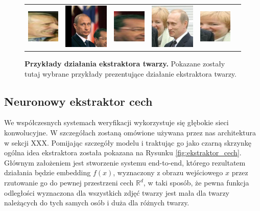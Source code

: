 \begin{figure}[H]
\begin{center}
\begin{tabular}{cc||cc||cc}
      \includegraphics[width=.15\linewidth]{img/crop_examples/after/bad/Jennifer_Lopez_0020.jpg} &
      \includegraphics[width=.15\linewidth]{img/crop_examples/before/bad/Vladimir_Putin_0031.jpg} &
      \includegraphics[width=.15\linewidth]{img/crop_examples/after/bad/Vladimir_Putin_0031.jpg} &
      \includegraphics[width=.15\linewidth]{img/crop_examples/before/bad/Vladimir_Putin_0040.jpg} &
      \includegraphics[width=.15\linewidth]{img/crop_examples/after/bad/Vladimir_Putin_0040.jpg} \\
    \end{tabular}
    \end{center}
    \caption{{\bf Przykłady działania ekstraktora twarzy.} Pokazane zostały tutaj wybrane przykłady prezentujące działanie ekstraktora twarzy.}
    \label{fig:ekstraktor_twarzy}
    \end{figure}

\subsection{Neuronowy ekstraktor cech} \label{sec:ekstraktor}

We współczesnych systemach weryfikacji wykorzystuje się głębokie sieci konwolucyjne. W
szczegółach zostaną omówione używana przez nas architektura w sekcji XXX. Pomijając szczegóły
modelu i traktując go jako czarną skrzynkę ogólna idea ekstraktora została pokazana na Rysunku
\ref{fig:ekstraktor_cech}. Głównym założeniem jest stworzenie systemu end-to-end, którego
rezultatem działania będzie embedding \(f(x)\), wyznaczony z obrazu wejściowego \(x\) przez
rzutowanie go do pewnej przestrzeni cech \(\mathbb{R}^d\), w taki sposób, że pewna funkcja
odległości wyznaczona dla wszystkich zdjęć twarzy jest mała dla twarzy należących do tych samych
osób i duża dla różnych twarzy. 

